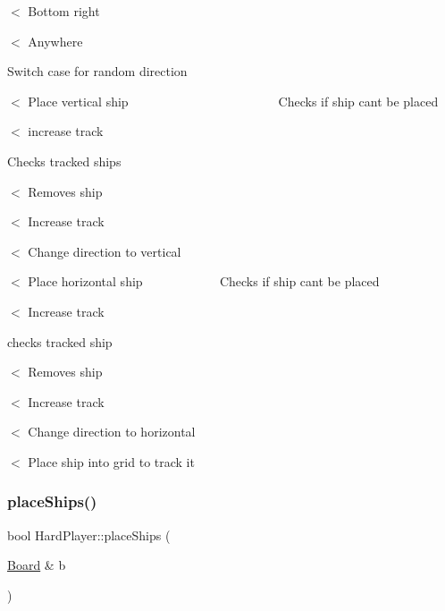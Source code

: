 $<$ Bottom right

$<$ Anywhere

Switch case for random direction

$<$ Place vertical ship ~\newline
~\newline
~\newline
~\newline
~\newline
~\newline
~\newline
~\newline
~\newline
~\newline
~\newline
~\newline
~\newline
~\newline
 Checks if ship can\textquotesingle{}t be placed

$<$ increase track

Checks tracked ships

$<$ Removes ship

$<$ Increase track

$<$ Change direction to vertical

$<$ Place horizontal ship ~\newline
~\newline
~\newline
~\newline
~\newline
~\newline
~\newline
 Checks if ship can\textquotesingle{}t be placed

$<$ Increase track

checks tracked ship

$<$ Removes ship

$<$ Increase track

$<$ Change direction to horizontal

$<$ Place ship into grid to track it \mbox{\label{class_hard_player_a27d0ad3353eba585d7a93d2092036f98}} 
\subsubsection{\texorpdfstring{place\+Ships()}{placeShips()}}
{\footnotesize\ttfamily bool Hard\+Player\+::place\+Ships (\begin{DoxyParamCaption}\item[{\mbox{\hyperlink{class_board}{Board}} \&}]{b }\end{DoxyParamCaption})\hspace{0.3cm}{\ttfamily [virtual]}}



